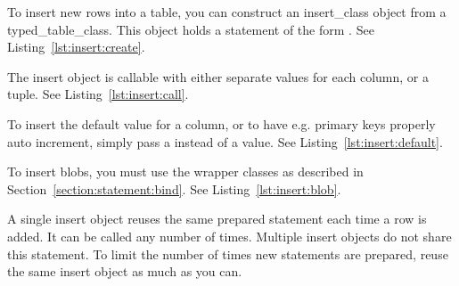 To insert new rows into a table, you can construct an \gls{insert_class} object from a \gls{typed_table_class}. This object holds a statement of the form . See Listing~\ref{lst:insert:create}.



The insert object is callable with either separate values for each column, or a tuple. See Listing~\ref{lst:insert:call}.



To insert the default value for a column, or to have e.g. primary keys properly auto increment, simply pass a  instead of a value. See Listing~\ref{lst:insert:default}.



To insert blobs, you must use the wrapper classes as described in Section~\ref{section:statement:bind}. See Listing~\ref{lst:insert:blob}.



A single insert object reuses the same prepared statement each time a row is added. It can be called any number of times. Multiple insert objects do not share this statement. To limit the number of times new statements are prepared, reuse the same insert object as much as you can.
